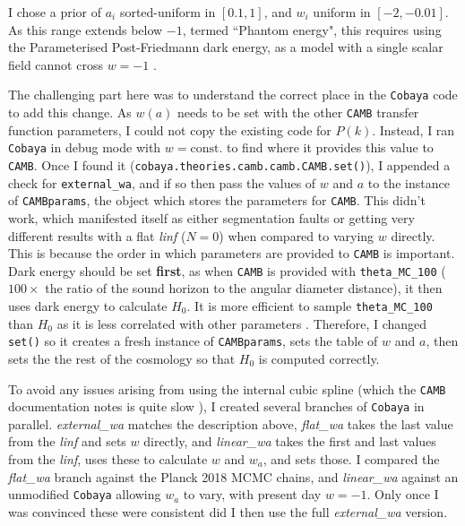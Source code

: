 \documentclass{article}
\begin{document}
I chose a prior of $a_i$ sorted-uniform in $[0.1, 1]$, and $w_i$ uniform in $[-2, -0.01]$. As this range extends below $-1$, termed ``Phantom energy", this requires using the Parameterised Post-Friedmann dark energy, as a model with a single scalar field cannot cross $w=-1$ \cite{PPF}. 

The challenging part here was to understand the correct place in the \texttt{Cobaya} code to add this change. As $w(a)$ needs to be set with the other \texttt{CAMB} transfer function parameters, I could not copy the existing code for $P(k)$. Instead, I ran \texttt{Cobaya} in debug mode with $w=\textrm{const.}$ to find where it provides this value to \texttt{CAMB}. Once I found it (\texttt{cobaya.theories.camb.camb.CAMB.set()}), I appended a check for \texttt{external\_wa}, and if so then pass the values of $w$ and $a$ to the instance of \texttt{CAMBparams}, the object which stores the parameters for \texttt{CAMB}. This didn't work, which manifested itself as either segmentation faults or getting very different results with a flat \textit{linf} ($N=0$) when compared to varying $w$ directly. This is because the order in which parameters are provided to \texttt{CAMB} is important. Dark energy should be set \textbf{first}, as when \texttt{CAMB} is provided with \texttt{theta\_MC\_100} ($100 \times$ the ratio of the sound horizon to the angular diameter distance), it then uses dark energy to calculate $H_0$. It is more efficient to sample \texttt{theta\_MC\_100} than $H_0$ as it is less correlated with other parameters \cite{CosmoMCReadMe}. Therefore, I changed \texttt{set()} so it creates a fresh instance of \texttt{CAMBparams}, sets the table of $w$ and $a$, then sets the the rest of the cosmology so that $H_0$ is computed correctly.

To avoid any issues arising from using the internal cubic spline (which the \texttt{CAMB} documentation notes is quite slow \cite{CAMBdocs}), I created several branches of \texttt{Cobaya} in parallel. \textit{external\_wa} matches the description above, \textit{flat\_wa} takes the last value from the \textit{linf} and sets $w$ directly, and \textit{linear\_wa} takes the first and last values from the \textit{linf}, uses these to calculate $w$ and $w_a$, and sets those. I compared the \textit{flat\_wa} branch against the Planck 2018 MCMC chains, and \textit{linear\_wa} against an unmodified \texttt{Cobaya} allowing $w_a$ to vary, with present day $w=-1$. Only once I was convinced these were consistent did I then use the full \textit{external\_wa} version.
\end{document}
